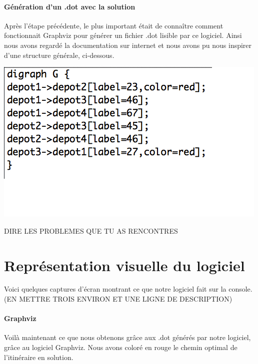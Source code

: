 \documentclass[12pt,a4paper]{report}
\begin{document}
\paragraph{Génération d'un .dot avec la solution}
Après l'étape précédente, le plus important était de connaître comment fonctionnait Graphviz pour générer un fichier .dot lisible par ce logiciel. Ainsi nous avons regardé la documentation sur internet et nous avons pu nous inspirer d'une structure générale, ci-dessous.
\begin{center}
\includegraphics[scale=0.4]{capture3.png}
\end{center}
DIRE LES PROBLEMES QUE TU AS RENCONTRES

\section{Représentation visuelle du logiciel}
Voici quelques captures d'écran montrant ce que notre logiciel fait sur la console. (EN METTRE TROIS ENVIRON ET UNE LIGNE DE DESCRIPTION)

\paragraph{Graphviz}
Voilà maintenant ce que nous obtenons grâce aux .dot générés par notre logiciel, grâce au logiciel Graphviz. Nous avons coloré en rouge le chemin optimal de l'itinéraire en solution.
\end{document}

